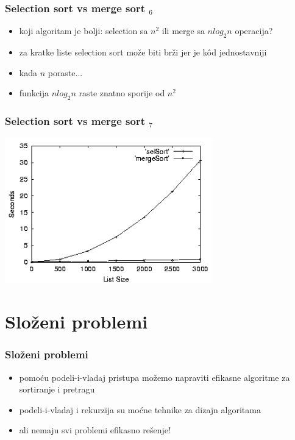 \documentclass[utf8,compress]{beamer}
\begin{document}
\begin{frame}[fragile]
  \frametitle{Selection sort vs merge sort $_6$}
  \begin{itemize}
    \item koji algoritam je bolji: selection sa $n^2$ ili merge sa $n log_2 n$ operacija?
    \item za kratke liste selection sort može biti brži jer je kôd jednostavniji
    \item kada $n$ poraste...
    \item funkcija $n log_2 n$ raste znatno sporije od $n^2$
  \end{itemize}
\end{frame}

\begin{frame}[fragile]
  \frametitle{Selection sort vs merge sort $_7$}
\begin{center}
  \includegraphics[width=9cm]{pic29}
\end{center}
\end{frame}

\section{Složeni problemi}

\begin{frame}[fragile]
  \frametitle{Složeni problemi}
  \begin{itemize}
    \item pomoću podeli-i-vladaj pristupa možemo napraviti efikasne algoritme za sortiranje i pretragu
    \item podeli-i-vladaj i rekurzija su moćne tehnike za dizajn algoritama
    \item ali nemaju svi problemi efikasno rešenje!
  \end{itemize}
\end{frame}
\end{document}
